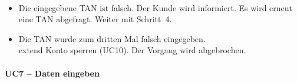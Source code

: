 \documentclass[12pt]{scrartcl}
\newcommand{\umark}[1]{\guillemotleft #1\guillemotright}
\begin{document}
\begin{description}[leftmargin=4.5cm, style=nextline, font=\normalfont\bfseries]
  \item[Alternativablauf:]~
  \begin{itemize}
      \item[(5')] Die eingegebene TAN ist falsch. Der Kunde wird informiert.
      Es wird erneut eine TAN abgefragt. Weiter mit Schritt~4.
      \item[(5'')] Die TAN wurde zum dritten Mal falsch eingegeben.\\
      \umark{extend} Konto sperren (UC10). Der Vorgang wird abgebrochen.
  \end{itemize}
    \end{description}

    \paragraph{UC7 -- Daten eingeben}~\\[4pt]
\end{document}
